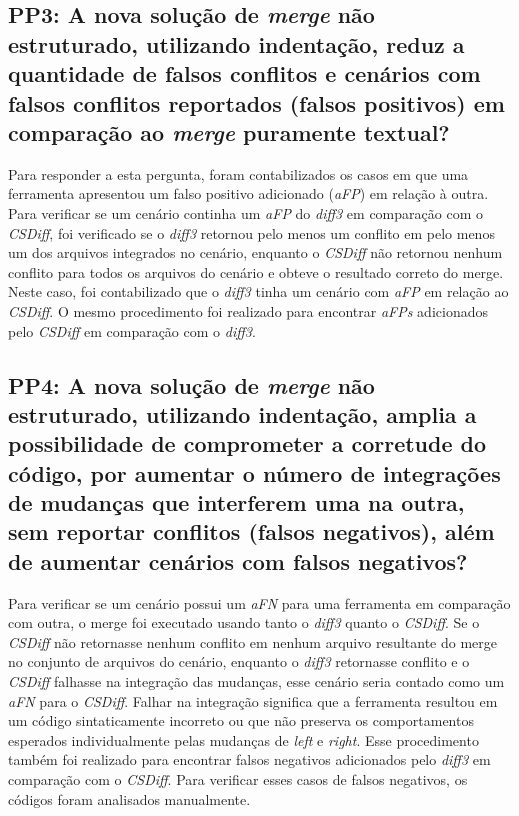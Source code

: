 \subsection{PP3: A nova solução de \emph{merge} não estruturado, utilizando indentação,
	reduz a quantidade de falsos conflitos e cenários com falsos conflitos reportados
	(falsos positivos) em comparação ao \emph{merge} puramente textual?}
Para responder a esta pergunta, foram contabilizados os casos em que uma
ferramenta apresentou um falso positivo adicionado (\emph{aFP}) em relação à outra.
Para verificar se um cenário continha um \emph{aFP} do \emph{diff3} em comparação com o \emph{CSDiff},
foi verificado se o \emph{diff3} retornou pelo menos um conflito em pelo menos um dos arquivos integrados no cenário,
enquanto o \emph{CSDiff} não retornou nenhum conflito para todos os arquivos do cenário e obteve o resultado correto do merge.
Neste caso, foi contabilizado que o \emph{diff3} tinha um cenário com \emph{aFP} em relação ao \emph{CSDiff}.
O mesmo procedimento foi realizado para encontrar \emph{aFPs} adicionados pelo \emph{CSDiff} em comparação com o \emph{diff3}.
\subsection{PP4: A nova solução de \emph{merge} não estruturado, utilizando indentação,
	amplia a possibilidade de comprometer a corretude do código, por aumentar o número de
	integrações de mudanças que interferem uma na outra, sem reportar conflitos (falsos negativos),
	além de aumentar cenários com falsos negativos?}
Para verificar se um cenário possui um \emph{aFN} para uma ferramenta em comparação com outra,
o merge foi executado usando tanto o \emph{diff3} quanto o \emph{CSDiff}. Se o \emph{CSDiff} não retornasse nenhum
conflito em nenhum arquivo resultante do merge no conjunto de arquivos do cenário, enquanto o
\emph{diff3} retornasse conflito e o \emph{CSDiff} falhasse na integração das mudanças, esse cenário seria
contado como um \emph{aFN} para o \emph{CSDiff}. Falhar na integração significa que a ferramenta resultou em um
código sintaticamente incorreto ou que não preserva os comportamentos esperados individualmente pelas
mudanças de \emph{left} e \emph{right}. Esse procedimento também foi realizado para encontrar falsos negativos
adicionados pelo \emph{diff3} em comparação com o \emph{CSDiff}. Para verificar esses casos de falsos negativos,
os códigos foram analisados manualmente.
